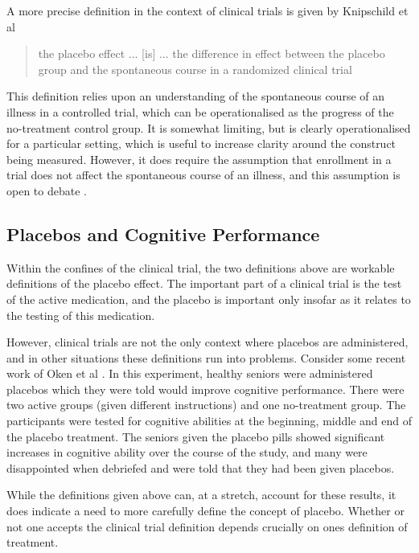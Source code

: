 A more precise definition in the context of clinical trials is given by Knipschild et al \cite{Knipschild2005}

\begin{quotation}
   the placebo effect ... [is] ... the difference in effect between the placebo group and the spontaneous course in a randomized clinical trial 
\end{quotation}

This definition relies upon an understanding of the spontaneous course of an illness in a controlled trial, which can be operationalised as the progress of the no-treatment control group. It is somewhat limiting, but is clearly operationalised for a particular setting, which is useful to increase clarity around the construct  being measured. However, it does require the assumption that enrollment in a trial does not affect the spontaneous course of an illness, and this assumption is open to debate \cite{Moerman2000}.

\subsection{Placebos and Cognitive Performance}
\label{sec:plac-cogn-perf}

Within the confines of the clinical trial, the two definitions above are workable definitions of the placebo effect. The important part of a clinical trial is the test of the active medication, and the placebo is important only insofar as it relates to the testing of this medication. 

However, clinical trials are not the only context where placebos are administered, and in other situations these definitions run into problems. Consider some recent work of Oken et al \cite{Oken2008}. In this experiment, healthy seniors were administered placebos which they were told would improve cognitive performance. There were two active groups (given different instructions) and one no-treatment group. The participants were tested for cognitive abilities at the beginning, middle and end of the placebo treatment.  The seniors given the placebo pills showed significant increases in cognitive ability over the course of the study, and many were disappointed when debriefed and were told that they had been given placebos.

While the definitions given above can, at a stretch, account for these results, it does indicate a need to more carefully define the concept of placebo. Whether or not one accepts the clinical trial definition depends crucially on ones definition of treatment. 


